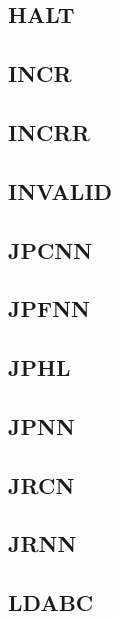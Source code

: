 \documentclass[a4paper]{article}
\begin{document}
\subsection{HALT}
\sailfclHALTdecode
\sailfclHALTassembly
\sailfclHALTexecute
\subsection{INCR}
\sailfclINCRrdecode
\sailfclINCRRrrdecode
\sailfclINCRassembly
\sailfclINCRRassembly
\sailfclINCRexecute
\sailfclINCRRexecute
\subsection{INCRR}
\sailfclINCRRrrdecode
\sailfclINCRRassembly
\sailfclINCRRexecute
\subsection{INVALID}
\sailfclINVALIDnotSupporteddecodeTwoFour
\sailfclINVALIDassembly
\sailfclINVALIDexecute
\subsection{JPCNN}
\sailfclJPCNNdecodeTwoFour
\sailfclJPCNNassembly
\sailfclJPCNNexecute
\subsection{JPFNN}
\sailfclJPFNNdecodeTwoFour
\sailfclJPFNNassembly
\sailfclJPFNNexecute
\subsection{JPHL}
\sailfclJPHLdecode
\sailfclJPHLassembly
\sailfclJPHLexecute
\subsection{JPNN}
\sailfclJPNNmakeLsbimmdecodeTwoFour
\sailfclJPNNassembly
\sailfclJPNNexecute
\subsection{JRCN}
\sailfclJRCNdecodeOneSix
\sailfclJRCNassembly
\sailfclJRCNexecute
\subsection{JRNN}
\sailfclJRNNimmdecodeOneSix
\sailfclJRNNassembly
\sailfclJRNNexecute
\subsection{LDABC}
\sailfclLDABCdecode
\sailfclLDABCassembly
\sailfclLDABCexecute
\end{document}
